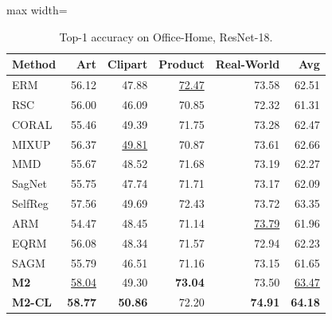 \documentclass{article}
\begin{document}
\begin{table}[htbp]
\centering
\caption{Top-1 accuracy on Office-Home, ResNet-18.}
\scriptsize
\begin{adjustbox}{max width=\textwidth}
\begin{tabular}{lrrrrr}
\toprule
Method & Art & Clipart & Product & Real-World & Avg \\
\midrule
ERM & 56.12 & 47.88 & \underline{72.47} & 73.58 & 62.51 \\
RSC & 56.00 & 46.09 & 70.85 & 72.32 & 61.31 \\
CORAL & 55.46 & 49.39 & 71.75 & 73.28 & 62.47 \\
MIXUP & 56.37 & \underline{49.81} & 70.87 & 73.61 & 62.66 \\
MMD & 55.67 & 48.52 & 71.68 & 73.19 & 62.27 \\
SagNet & 55.75 & 47.74 & 71.71 & 73.17 & 62.09 \\
SelfReg & 57.56 & 49.69 & 72.43 & 73.72 & 63.35 \\
ARM & 54.47 & 48.45 & 71.14 & \underline{73.79} & 61.96 \\
EQRM & 56.08 & 48.34 & 71.57 & 72.94 & 62.23 \\
SAGM & 55.79 & 46.51 & 71.16 & 73.15 & 61.65 \\
\midrule
\textbf{M2} & \underline{58.04} & 49.30 & \textbf{73.04} & 73.50 & \underline{63.47} \\
\textbf{M2-CL} & \textbf{58.77} & \textbf{50.86} & 72.20 & \textbf{74.91} & \textbf{64.18} \\
\bottomrule
\end{tabular}
\end{adjustbox}
\end{table}
\end{document}
